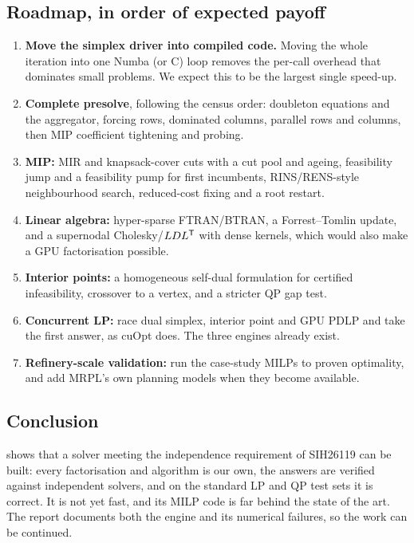 \subsection{Roadmap, in order of expected payoff}
\begin{enumerate}
  \item \textbf{Move the simplex driver into compiled code.} Moving the whole iteration into one Numba
        (or C) loop removes the per-call overhead that dominates small problems. We expect this to be
        the largest single speed-up.
  \item \textbf{Complete presolve}, following the census order: doubleton equations and the
        aggregator, forcing rows, dominated columns, parallel rows and columns, then MIP coefficient
        tightening and probing.
  \item \textbf{MIP:} MIR and knapsack-cover cuts with a cut pool and ageing, feasibility jump and a
        feasibility pump for first incumbents, RINS/RENS-style neighbourhood search, reduced-cost fixing
        and a root restart.
  \item \textbf{Linear algebra:} hyper-sparse FTRAN/BTRAN, a Forrest--Tomlin update, and a supernodal
        Cholesky/$LDL^{\mathsf{T}}$ with dense kernels, which would also make a GPU factorisation possible.
  \item \textbf{Interior points:} a homogeneous self-dual formulation for certified infeasibility,
        crossover to a vertex, and a stricter QP gap test.
  \item \textbf{Concurrent LP:} race dual simplex, interior point and GPU PDLP and take the first answer,
        as cuOpt does. The three engines already exist.
  \item \textbf{Refinery-scale validation:} run the case-study MILPs to proven optimality, and add
        MRPL's own planning models when they become available.
\end{enumerate}

\subsection{Conclusion}
\nirnay{} shows that a solver meeting the independence requirement of SIH26119 can be built: every
factorisation and algorithm is our own, the answers are verified against independent solvers, and on
the standard LP and QP test sets it is correct. It is not yet fast, and its MILP code is far behind the
state of the art. The report documents both the engine and its numerical failures, so the work can be
continued.
